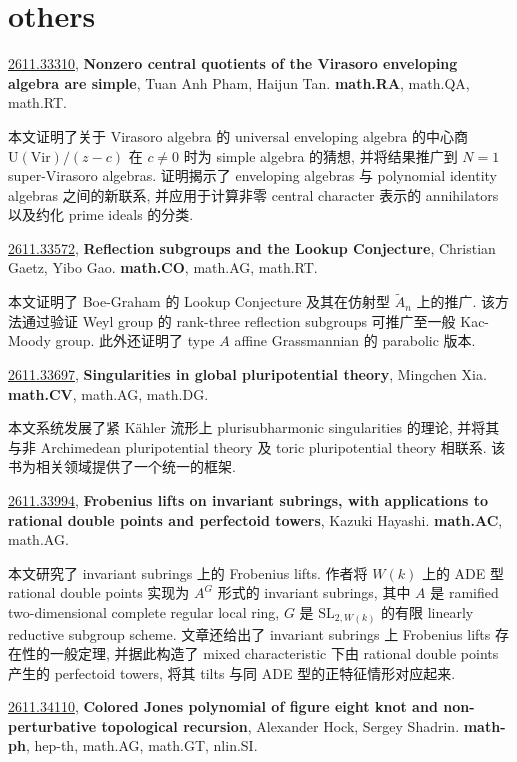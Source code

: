 \documentclass[9pt, a4paper]{article}
\theoremstyle{plain}
\theoremstyle{definition}
\theoremstyle{remark}
\newcommand{\arxivwithtarget}[3]{\hypertarget{#1}{}\href{https://arxiv.org/abs/#1}{#1}, \textbf{\textcolor{arxivblue}{#2}}, #3. }
\begin{document}
\section{others}
\arxivwithtarget{2611.33310}{Nonzero central quotients of the Virasoro enveloping algebra are simple}{Tuan Anh Pham, Haijun Tan}\textbf{math.RA}, math.QA, math.RT.

本文证明了关于 Virasoro algebra 的 universal enveloping algebra 的中心商 $\mathrm{U}(\mathrm{Vir})/(z-c)$ 在 $c \neq 0$ 时为 simple algebra 的猜想, 并将结果推广到 $N=1$ super-Virasoro algebras. 证明揭示了 enveloping algebras 与 polynomial identity algebras 之间的新联系, 并应用于计算非零 central character 表示的 annihilators 以及约化 prime ideals 的分类.


\arxivwithtarget{2611.33572}{Reflection subgroups and the Lookup Conjecture}{Christian Gaetz, Yibo Gao}\textbf{math.CO}, math.AG, math.RT.

本文证明了 Boe-Graham 的 Lookup Conjecture 及其在仿射型 $\widetilde{A}_n$ 上的推广. 该方法通过验证 Weyl group 的 rank-three reflection subgroups 可推广至一般 Kac-Moody group. 此外还证明了 type $A$ affine Grassmannian 的 parabolic 版本.


\arxivwithtarget{2611.33697}{Singularities in global pluripotential theory}{Mingchen Xia}\textbf{math.CV}, math.AG, math.DG.

本文系统发展了紧 Kähler 流形上 plurisubharmonic singularities 的理论, 并将其与非 Archimedean pluripotential theory 及 toric pluripotential theory 相联系. 该书为相关领域提供了一个统一的框架.


\arxivwithtarget{2611.33994}{Frobenius lifts on invariant subrings, with applications to rational double points and perfectoid towers}{Kazuki Hayashi}\textbf{math.AC}, math.AG.

本文研究了 invariant subrings 上的 Frobenius lifts. 作者将 $W(k)$ 上的 ADE 型 rational double points 实现为 $A^G$ 形式的 invariant subrings, 其中 $A$ 是 ramified two-dimensional complete regular local ring, $G$ 是 $\mathrm{SL}_{2,W(k)}$ 的有限 linearly reductive subgroup scheme. 文章还给出了 invariant subrings 上 Frobenius lifts 存在性的一般定理, 并据此构造了 mixed characteristic 下由 rational double points 产生的 perfectoid towers, 将其 tilts 与同 ADE 型的正特征情形对应起来.


\arxivwithtarget{2611.34110}{Colored Jones polynomial of figure eight knot and non-perturbative topological recursion}{Alexander Hock, Sergey Shadrin}\textbf{math-ph}, hep-th, math.AG, math.GT, nlin.SI.
\end{document}
